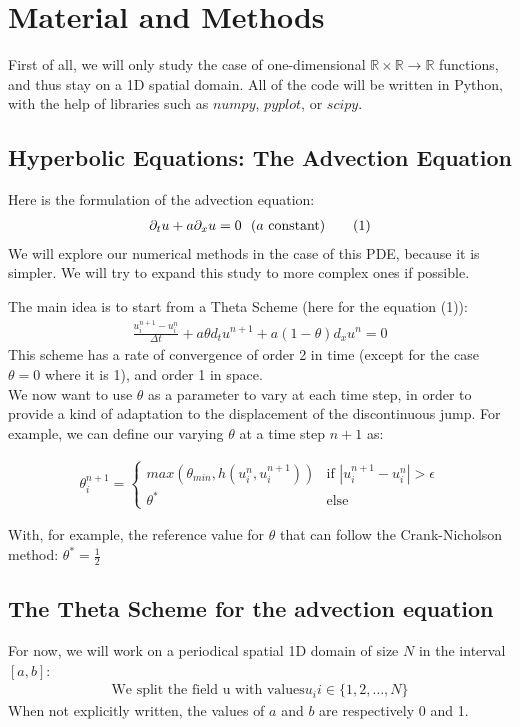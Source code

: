 \documentclass[12pt]{article}
\begin{document}
\section{Material and Methods}
First of all, we will only study the case of one-dimensional $\mathbb{R} \times \mathbb{R} \rightarrow \mathbb{R}$ functions, and thus stay on a 1D spatial domain.
All of the code will be written in Python, with the help of libraries such as $numpy$, $pyplot$, or $scipy$.

\subsection{Hyperbolic Equations: The Advection Equation}
Here is the formulation of the advection equation:
\begin{align*}
    \partial_t u + a\partial_x u = 0 \text{\space \space ($a$ constant)} \tag{1}
\end{align*}
\vspace{10pt}
We will explore our numerical methods in the case of this PDE, because it is simpler. We will try to expand this study to more complex ones if possible.


The main idea is to start from a Theta Scheme (here for the equation (1)):
\begin{align*}
    \frac{u_i^{n+1} - u_i^n}{\Delta t} + a\theta d_t u^{n+1} + a(1-\theta) d_x u^n = 0 \tag{2}
\end{align*}
This scheme has a rate of convergence of order 2 in time (except for the case $\theta=0$ where it is 1), and order 1 in space.\\
We now want to use $\theta$ as a parameter to vary at each time step, in order to provide a kind of adaptation to the displacement of the discontinuous jump.
For example, we can define our varying $\theta$ at a time step $n+1$ as:

\begin{align*}
    \theta_i^{n+1} = \begin{cases}
        max(\theta_{min}, h(u_i^n, u_i^{n+1})) & \text{if } |u_i^{n+1} - u_i^n| > \epsilon \\
        \theta^* & \text{else} 
    \end{cases}
\end{align*}

With, for example, the reference value for $\theta$ that can follow the Crank-Nicholson method: $\theta^* = \frac{1}{2}$

\subsection{The Theta Scheme for the advection equation}
For now, we will work on a periodical spatial 1D domain of size $N$ in the interval $[a,b]$:
\begin{align*}
    \text{We split the field u with values} u_i i \in \{1, 2, \ldots, N\}
\end{align*}
When not explicitly written, the values of $a$ and $b$ are respectively 0 and 1.
\end{document}
